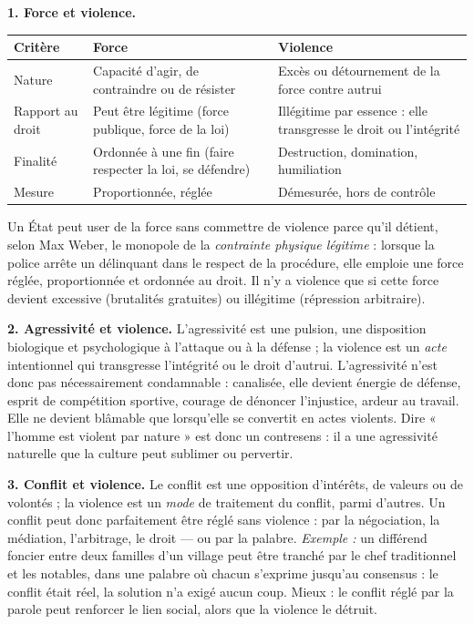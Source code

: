 \documentclass[11pt]{article}
\newcommand{\cle}[1]{{\popxbold\color{popdark}#1}}
\begin{document}
\begin{corrige}

\textbf{1. Force et violence.}

\begin{center}
\begin{tabularx}{\linewidth}{|l|X|X|}
\hline
\rowcolor{popblueL} \textbf{Critère} & \textbf{Force} & \textbf{Violence} \\
\hline
Nature & Capacité d'agir, de contraindre ou de résister & Excès ou détournement de la force contre autrui \\
\hline
Rapport au droit & Peut être légitime (force publique, force de la loi) & Illégitime par essence : elle transgresse le droit ou l'intégrité \\
\hline
Finalité & Ordonnée à une fin (faire respecter la loi, se défendre) & Destruction, domination, humiliation \\
\hline
Mesure & Proportionnée, réglée & Démesurée, hors de contrôle \\
\hline
\end{tabularx}
\end{center}

Un État peut user de la force sans commettre de violence parce qu'il détient, selon Max Weber, le monopole de la \emph{contrainte physique légitime} : lorsque la police arrête un délinquant dans le respect de la procédure, elle emploie une force réglée, proportionnée et ordonnée au droit. Il n'y a violence que si cette force devient excessive (brutalités gratuites) ou illégitime (répression arbitraire).

\textbf{2. Agressivité et violence.} L'\cle{agressivité} est une pulsion, une disposition biologique et psychologique à l'attaque ou à la défense ; la \cle{violence} est un \emph{acte} intentionnel qui transgresse l'intégrité ou le droit d'autrui. L'agressivité n'est donc pas nécessairement condamnable : canalisée, elle devient énergie de défense, esprit de compétition sportive, courage de dénoncer l'injustice, ardeur au travail. Elle ne devient blâmable que lorsqu'elle se convertit en actes violents. Dire « l'homme est violent par nature » est donc un contresens : il a une agressivité naturelle que la culture peut sublimer ou pervertir.

\textbf{3. Conflit et violence.} Le \cle{conflit} est une opposition d'intérêts, de valeurs ou de volontés ; la violence est un \emph{mode} de traitement du conflit, parmi d'autres. Un conflit peut donc parfaitement être réglé sans violence : par la négociation, la médiation, l'arbitrage, le droit — ou par la palabre. \emph{Exemple :} un différend foncier entre deux familles d'un village peut être tranché par le chef traditionnel et les notables, dans une palabre où chacun s'exprime jusqu'au consensus : le conflit était réel, la solution n'a exigé aucun coup. Mieux : le conflit réglé par la parole peut renforcer le lien social, alors que la violence le détruit.

\end{corrige}
\end{document}

